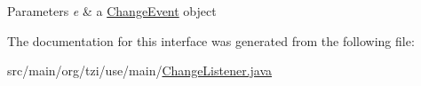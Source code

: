 \begin{DoxyParams}{Parameters}
{\em e} & a \hyperlink{classorg_1_1tzi_1_1use_1_1main_1_1_change_event}{Change\-Event} object \\
\hline
\end{DoxyParams}


The documentation for this interface was generated from the following file\-:\begin{DoxyCompactItemize}
\item 
src/main/org/tzi/use/main/\hyperlink{_change_listener_8java}{Change\-Listener.\-java}\end{DoxyCompactItemize}

